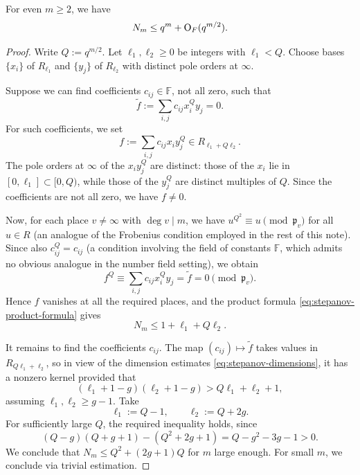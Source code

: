 \documentclass[reqno]{amsart} 
\begin{document}
\begin{proposition}\label{proposition:stepanov}
  For even $m\geq2$, we have
  \begin{equation*}
    N_m\leq q^m+\operatorname{O}_F(q^{m/2}).
  \end{equation*}
\end{proposition}
\begin{proof}
  Write $Q:=q^{m/2}$.  Let $\ell_1,\ell_2\geq0$ be integers with $\ell_1<Q$.  Choose bases $\{x_i\}$ of $R_{\ell_1}$ and $\{y_j\}$ of $R_{\ell_2}$ with distinct pole orders at $\infty$.

  Suppose we can find coefficients $c_{ij}\in\mathbb{F}$, not all zero, such that
  \begin{equation*}
    \widetilde f:=\sum_{i,j}c_{ij}x_i^Qy_j=0.
  \end{equation*}
  For such coefficients, we set
  \begin{equation*}
    f:=\sum_{i,j}c_{ij}x_i y_j^Q\in R_{\ell_1+Q\ell_2}.
  \end{equation*}
  The pole orders at $\infty$ of the $x_i y_j^Q$ are distinct: those of the $x_i$ lie in $[0,\ell_1]\subset[0,Q)$, while those of the $y_j^Q$ are distinct multiples of $Q$.  Since the coefficients are not all zero, we have $f\ne0$.

  Now, for each place $v\ne\infty$ with $\deg v\mid m$, we have $u^{Q^2}\equiv u\pmod{\mathfrak{p}_v}$ for all $u\in R$ (an analogue of the Frobenius condition employed in the rest of this note).  Since also $c_{ij}^Q=c_{ij}$ (a condition involving the field of constants $\mathbb{F}$, which admits no obvious analogue in the number field setting), we obtain
  \begin{equation*}
    f^Q\equiv\sum_{i,j}c_{ij}x_i^Qy_j=\widetilde f=0\pmod{\mathfrak{p}_v}.
  \end{equation*}
  Hence $f$ vanishes at all the required places, and the product formula \eqref{eq:stepanov-product-formula} gives
  \begin{equation*}
    N_m\leq1+\ell_1+Q\ell_2.
  \end{equation*}

  It remains to find the coefficients $c_{i j}$.  The map $(c_{ij})\mapsto\widetilde f$ takes values in $R_{Q\ell_1+\ell_2}$, so in view of the dimension estimates \eqref{eq:stepanov-dimensions}, it has a nonzero kernel provided that
  \begin{equation*}
    (\ell_1+1-g)(\ell_2+1-g)>Q\ell_1+\ell_2+1,
  \end{equation*}
  assuming $\ell_1,\ell_2\geq g-1$.  Take
  \begin{equation*}
    \ell_1:=Q-1,\qquad \ell_2:=Q+2g.
  \end{equation*}
  For sufficiently large $Q$, the required inequality holds, since
  \begin{equation*}
    (Q-g)(Q+g+1)-(Q^2+2g+1)=Q-g^2-3g-1>0.
  \end{equation*}
  We conclude that $N_m\leq Q^2+(2g+1)Q$ for $m$ large enough.  For small $m$, we conclude via trivial estimation.
\end{proof}
\end{document}
